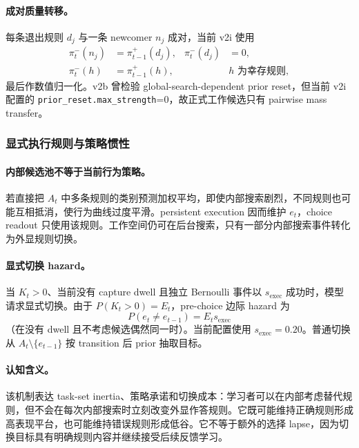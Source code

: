 \paragraph{成对质量转移。}
每条退出规则 $d_j$ 与一条 newcomer $n_j$ 成对，当前 v2i 使用
\begin{align}
\pi^-_t(n_j)&=\pi^+_{t-1}(d_j),
&
\pi^-_t(d_j)&=0,
\nonumber\\
\pi^-_t(h)&=\pi^+_{t-1}(h),
&&h\text{ 为幸存规则},
\label{eq:model0811-pairwise-transfer}
\end{align}
最后作数值归一化。v2b 曾检验 global-search-dependent prior reset，但当前 v2i 配置的
\texttt{prior\_reset.max\_strength}=0，故正式工作候选只有 pairwise mass transfer。


\subsubsection{显式执行规则与策略惯性}

\paragraph{内部候选池不等于当前行为策略。}
若直接把 $A_t$ 中多条规则的类别预测加权平均，即使内部搜索剧烈，不同规则也可能互相抵消，使行为曲线过度平滑。persistent execution 因而维护 $e_t$，choice readout 只使用该规则。工作空间仍可在后台搜索，只有一部分内部搜索事件转化为外显规则切换。

\paragraph{显式切换 hazard。}
当 $K_t>0$、当前没有 capture dwell 且独立 Bernoulli 事件以
$s_{\mathrm{exec}}$ 成功时，模型请求显式切换。由于 $P(K_t>0)=E_t$，pre-choice 边际 hazard 为
\begin{equation}
P(e_t\ne e_{t-1})=E_ts_{\mathrm{exec}}
\label{eq:model0811-execution-hazard}
\end{equation}
（在没有 dwell 且不考虑候选偶然同一时）。当前配置使用
$s_{\mathrm{exec}}=0.20$。普通切换从 $A_t\setminus\{e_{t-1}\}$ 按 transition 后 prior 抽取目标。

\paragraph{认知含义。}
该机制表达 task-set inertia、策略承诺和切换成本：学习者可以在内部考虑替代规则，但不会在每次内部搜索时立刻改变外显作答规则。它既可能维持正确规则形成高表现平台，也可能维持错误规则形成低谷。它不等于额外的选择 lapse，因为切换目标具有明确规则内容并继续接受后续反馈学习。


